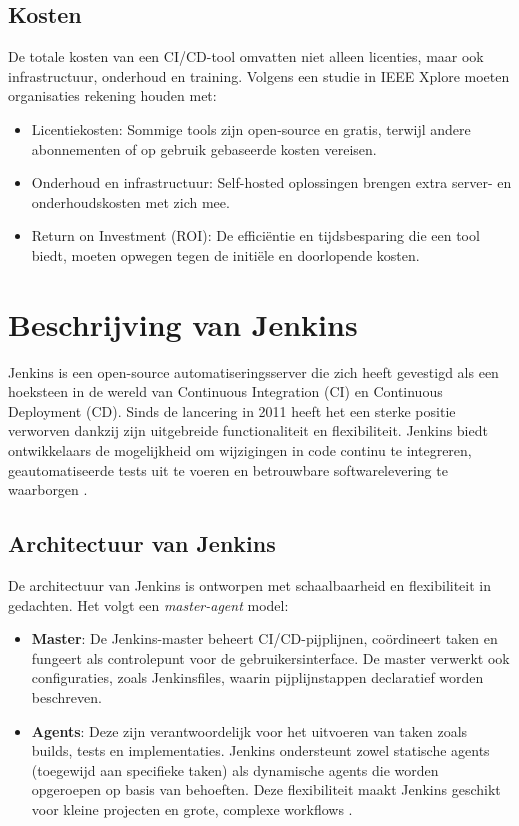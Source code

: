 \subsection{Kosten}
De totale kosten van een CI/CD-tool omvatten niet alleen licenties, maar ook infrastructuur, onderhoud en training. Volgens een studie in IEEE Xplore \autocite{ieee2023costbenefit} moeten organisaties rekening houden met: \begin{itemize} \item Licentiekosten: Sommige tools zijn open-source en gratis, terwijl andere abonnementen of op gebruik gebaseerde kosten vereisen. \item Onderhoud en infrastructuur: Self-hosted oplossingen brengen extra server- en onderhoudskosten met zich mee. \item Return on Investment (ROI): De efficiëntie en tijdsbesparing die een tool biedt, moeten opwegen tegen de initiële en doorlopende kosten. \end{itemize}
 
\section{Beschrijving van Jenkins}

Jenkins is een open-source automatiseringsserver die zich heeft gevestigd als een hoeksteen in de wereld van Continuous Integration (CI) en Continuous Deployment (CD). Sinds de lancering in 2011 heeft het een sterke positie verworven dankzij zijn uitgebreide functionaliteit en flexibiliteit. Jenkins biedt ontwikkelaars de mogelijkheid om wijzigingen in code continu te integreren, geautomatiseerde tests uit te voeren en betrouwbare softwarelevering te waarborgen \autocite{shahin2017}.

\subsection{Architectuur van Jenkins}

De architectuur van Jenkins is ontworpen met schaalbaarheid en flexibiliteit in gedachten. Het volgt een \textit{master-agent} model:
\begin{itemize}
    \item \textbf{Master}: De Jenkins-master beheert CI/CD-pijplijnen, coördineert taken en fungeert als controlepunt voor de gebruikersinterface. De master verwerkt ook configuraties, zoals Jenkinsfiles, waarin pijplijnstappen declaratief worden beschreven.
    \item \textbf{Agents}: Deze zijn verantwoordelijk voor het uitvoeren van taken zoals builds, tests en implementaties. Jenkins ondersteunt zowel statische agents (toegewijd aan specifieke taken) als dynamische agents die worden opgeroepen op basis van behoeften. Deze flexibiliteit maakt Jenkins geschikt voor kleine projecten en grote, complexe workflows \autocite{springer2023ci}.
\end{itemize}

